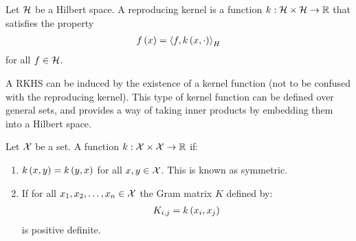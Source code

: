 \documentclass[12pt]{article}
\begin{document}
\begin{definition}
  Let \(\mathcal{H}\) be a Hilbert space.
  A reproducing kernel is a function
  \(k : \mathcal{H} \times \mathcal{H} \to \mathbb{R}\)
  that satisfies the property
  \begin{align}
    f\left(x\right) = \left\langle f, k\left(x, \cdot\right)\right\rangle_H
  \end{align}
  for all \(f \in \mathcal{H}\).
\end{definition}

A RKHS can be induced by the existence
of a kernel function (not to be confused with the reproducing kernel).
This type of kernel function can be defined over general sets,
and provides a way of taking inner products by embedding them
into a Hilbert space.

\begin{definition}[Kernel]
  Let \(\mathcal{X}\) be a set.
  A function \(k : \mathcal{X} \times \mathcal{X} \to \mathbb{R}\) if:

  \begin{enumerate}
    \item
      \(k\left(x, y\right) = k\left(y, x\right)\) for all \(x, y \in \mathcal{X}\).
      This is known as symmetric.

    \item
      If for all \(x_1, x_2, \ldots, x_n \in \mathcal{X}\)
      the Gram matrix \(K\)
      defined by:
      \begin{align}
        K_{i, j} = k\left(x_i, x_j\right)
      \end{align}
      is positive definite.


  \end{enumerate}

\end{definition}
\end{document}
